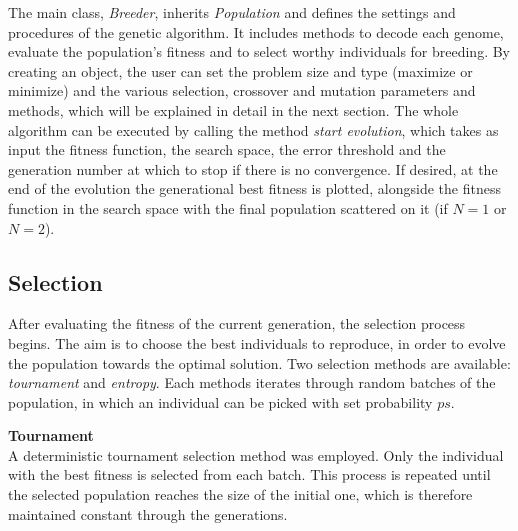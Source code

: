 \documentclass[twocolumn]{article}
\begin{document}
The main class, \textit{Breeder}, inherits \textit{Population} and defines the settings and procedures of the genetic algorithm. It includes methods to decode each genome, evaluate the population's fitness and to select worthy individuals for breeding. By creating an object, the user can set the problem size and type (maximize or minimize) and the various selection, crossover and mutation parameters and methods, which will be explained in detail in the next section. The whole algorithm can be executed by calling the method \textit{start evolution}, which takes as input the fitness function, the search space, the error threshold and the generation number at which to stop if there is no convergence. If desired, at the end of the evolution the generational best fitness is plotted, alongside the fitness function in the search space with the final population scattered on it (if $N = 1$ or $N = 2$).

\subsection{Selection}
After evaluating the fitness of the current generation, the selection process begins. The aim is to choose the best individuals to reproduce, in order to evolve the population towards the optimal solution. Two selection methods are available: \textit{tournament} and \textit{entropy}. Each methods iterates through random batches of the population, in which an individual can be picked with set probability $ps$.

\textbf{Tournament}\\
A deterministic tournament selection method was employed. Only the individual with the best fitness is selected from each batch. This process is repeated until the selected population reaches the size of the initial one, which is therefore maintained constant through the generations.
\end{document}
